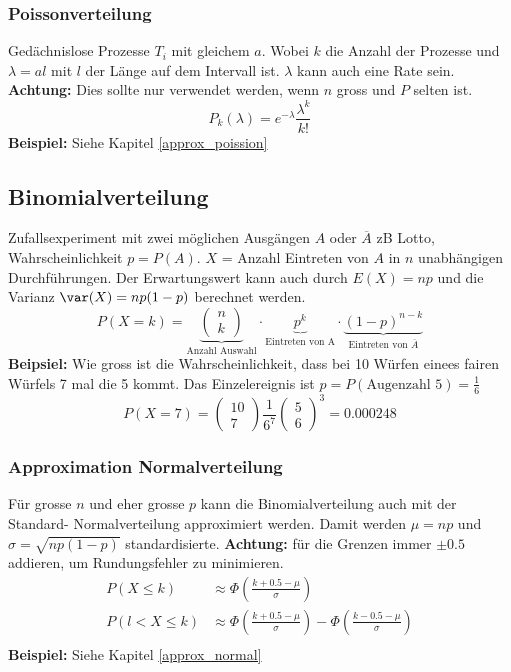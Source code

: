 \subsubsection{Poissonverteilung}
Gedächnislose Prozesse $T_i$ mit gleichem $a$. Wobei $k$ die Anzahl der Prozesse und $\lambda = al$ mit $l$ der Länge auf dem Intervall ist. $\lambda$ kann auch eine Rate sein. \textbf{Achtung:} Dies sollte nur verwendet werden, wenn $n$ gross und $P$ selten ist.
\[
P_k(\lambda) = e^{-\lambda}\frac{\lambda^k}{k!}
\]
\noindent\textbf{Beispiel:} Siehe Kapitel \ref{approx_poission}

\subsection{Binomialverteilung}
Zufallsexperiment mit zwei möglichen Ausgängen $A$ oder $\overline{A}$ zB Lotto, Wahrscheinlichkeit $p = P(A)$. $X$ = Anzahl Eintreten von $A$ in $n$ unabhängigen Durchführungen. Der Erwartungswert kann auch durch $E(X) = np$ und die Varianz $\var(X) = np(1 - p)$ berechnet werden.
\[
P(X = k) = \underbrace{\begin{pmatrix}	n \\ k \end{pmatrix}}_{\text{Anzahl Auswahl}}\cdot \underbrace{p^k}_{\text{Eintreten von A}}\cdot\underbrace{(1-p)^{n-k}}_{\text{Eintreten von }\overline{A
}}
\]
\noindent\textbf{Beipsiel:} Wie gross ist die Wahrscheinlichkeit, dass bei 10 Würfen einees fairen Würfels 7 mal die 5 kommt. Das Einzelereignis ist $p = P(\text{Augenzahl } 5) = \frac{1}{6}$
\[
P (X = 7) = \begin{pmatrix}	10 \\ 7 \end{pmatrix} \frac{1}{6^7}\begin{pmatrix}	5 \\ 6 \end{pmatrix}^3 = 0.000248
\]
\subsubsection{Approximation Normalverteilung}
Für grosse $n$ und eher grosse $p$ kann die Binomialverteilung auch mit der Standard- Normalverteilung approximiert werden. Damit werden $\mu = np$ und $\sigma = \sqrt{np(1-p)}$ standardisierte. \textbf{Achtung:} für die Grenzen immer $\pm 0.5$ addieren, um Rundungsfehler zu minimieren.
\begin{align*}
	P(X \leq k) &\approx \Phi(\frac{k + 0.5 - \mu}{\sigma}) \\
	P(l < X \leq k) &\approx \Phi(\frac{k + 0.5 - \mu}{\sigma})  - \Phi(\frac{k - 0.5 - \mu}{\sigma}) \\
\end{align*}
\noindent\textbf{Beispiel:} Siehe Kapitel \ref{approx_normal}

